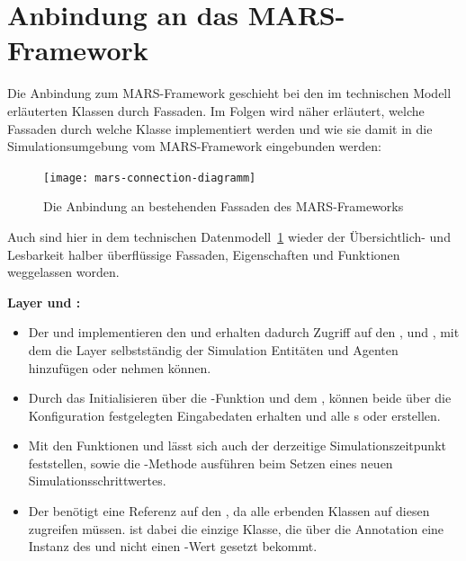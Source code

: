 %


\section{Anbindung an das MARS-Framework}\label{sec:mars-connection}

Die Anbindung zum MARS-Framework geschieht bei den im technischen Modell erläuterten Klassen durch Fassaden.
Im Folgen wird näher erläutert, welche Fassaden durch welche Klasse implementiert werden und wie sie damit in die Simulationsumgebung vom MARS-Framework eingebunden werden:

\begin{figure}[h]
    \centering
    \texttt{[image: mars-connection-diagramm]}~\caption{Die Anbindung an bestehenden Fassaden des MARS-Frameworks}
    \label{fig:mars-connection}
\end{figure}

Auch sind hier in dem technischen Datenmodell~\ref{fig:mars-connection} wieder der Übersichtlich- und Lesbarkeit halber überflüssige Fassaden, Eigenschaften und Funktionen weggelassen worden.

\textbf{Layer  und :}
\begin{itemize}
    \item Der  und  implementieren den  und erhalten dadurch Zugriff auf den , und , mit dem die Layer selbstständig der Simulation Entitäten und Agenten hinzufügen oder nehmen können.
    \item Durch das Initialisieren über die -Funktion und dem , können beide  über die Konfiguration festgelegten Eingabedaten erhalten und alle s oder  erstellen.
    \item Mit den Funktionen  und  lässt sich auch der derzeitige Simulationszeitpunkt feststellen, sowie die -Methode ausführen beim Setzen eines neuen Simulationsschrittwertes.
    \item Der  benötigt eine Referenz auf den , da alle erbenden Klassen auf diesen  zugreifen müssen.  ist dabei die einzige Klasse, die über die Annotation \code{[PropertyDescription]} eine Instanz des  und nicht einen -Wert gesetzt bekommt.
\end{itemize}

